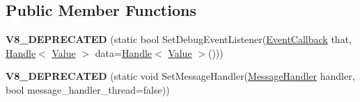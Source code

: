 \subsection*{Public Member Functions}
\begin{DoxyCompactItemize}
\item 
\hypertarget{classv8_1_1_debug_a34b64dfcd36a0545b25a0c3fc314e94b}{}{\bfseries V8\+\_\+\+D\+E\+P\+R\+E\+C\+A\+T\+E\+D} (static bool Set\+Debug\+Event\+Listener(\hyperlink{classv8_1_1_debug_a4be52510b70764b730dd1289bd9bbe37}{Event\+Callback} that, \hyperlink{classv8_1_1_handle}{Handle}$<$ \hyperlink{classv8_1_1_value}{Value} $>$ data=\hyperlink{classv8_1_1_handle}{Handle}$<$ \hyperlink{classv8_1_1_value}{Value} $>$()))\label{classv8_1_1_debug_a34b64dfcd36a0545b25a0c3fc314e94b}

\item 
\hypertarget{classv8_1_1_debug_a1df22b9a056dbc2f6a767403c30e2134}{}{\bfseries V8\+\_\+\+D\+E\+P\+R\+E\+C\+A\+T\+E\+D} (static void Set\+Message\+Handler(\hyperlink{classv8_1_1_debug_aea5c8ab838a3b3c263a71828fb0767ac}{Message\+Handler} handler, bool message\+\_\+handler\+\_\+thread=false))\label{classv8_1_1_debug_a1df22b9a056dbc2f6a767403c30e2134}

\end{DoxyCompactItemize}
